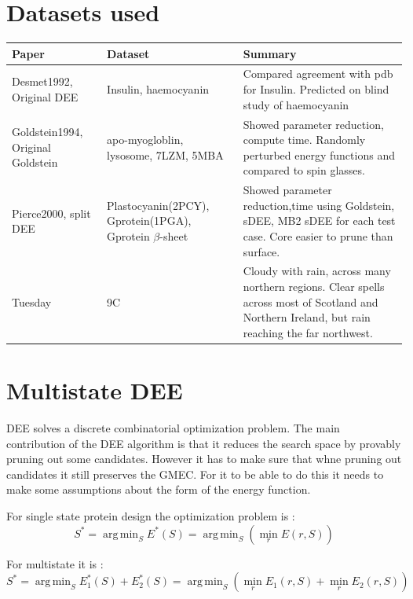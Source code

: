\documentclass{article}
\DeclareMathOperator*{\argmin}{arg\,min}
\begin{document}
\pagebreak
\newpage

\appendix


\section{Datasets used}


\begin{center}
    \begin{tabular}{ | p{3cm} | p{3cm} | p{6cm} |}
    \hline
    \textbf{Paper} & \textbf{Dataset} & \bf{Summary} \\ \hline
    Desmet1992, Original DEE~\cite{Desmet1992} & Insulin, haemocyanin & Compared agreement with pdb for Insulin. Predicted on blind study of haemocyanin \\ \hline
    Goldstein1994, Original Goldstein~\cite{Goldstein1994} & apo-myogloblin, lysosome, 7LZM, 5MBA& Showed parameter reduction, compute time. Randomly perturbed energy functions and compared to spin glasses. \\ \hline
Pierce2000, split DEE~\cite{Pierce2000} & Plastocyanin(2PCY), Gprotein(1PGA), Gprotein $\beta$-sheet& Showed parameter reduction,time using Goldstein, sDEE, MB2 sDEE for each test case. Core easier to prune than surface. \\ \hline
    Tuesday & 9C & Cloudy with rain, across many northern regions. Clear spells
    across most of Scotland and Northern Ireland,
    but rain reaching the far northwest. \\ 
    \hline
    \end{tabular}
\end{center}


\section{Multistate DEE}
DEE solves a discrete combinatorial optimization problem. The main contribution of the DEE algorithm is that it reduces the search space by provably pruning out some candidates. However it has to make sure that whne pruning out candidates it still preserves the GMEC. For it to be able to do this it needs to make some assumptions about the form of the energy function. 

For single state protein design the optimization problem is  : 
\[
S^* = \argmin_S E^*(S) = \argmin_S \left( \min_r E(r,S) \right)
\]

For multistate it is :
\[
S^* = \argmin_S E^*_1(S) + E^*_2(S) = \argmin_S\left( \min_r E_1(r,S) + \min_r E_2(r,S)\right)
\]
\end{document}

